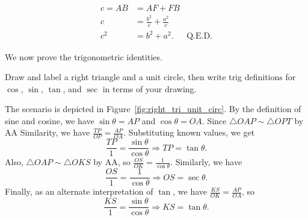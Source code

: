 \documentclass[../key.tex]{subfiles}
\begin{document}
\begin{align*}
c=AB &= AF+FB \\
c &= \frac{b^2}{c}+\frac{a^2}{c} \\
c^2 &= b^2 + a^2. & \text{Q.E.D.}
\end{align*}

\begin{outer_problem}
\item We now prove the trigonometric identities.
\end{outer_problem}

\begin{inner_problem}
\item Draw and label a right triangle and a unit circle, then write trig definitions for $\cos$, $\sin$, $\tan$, and $\sec$ in terms of your drawing.
\end{inner_problem}

\noindent The scenario is depicted in Figure~\ref{fig:right_tri_unit_circ}. By the definition of sine and cosine, we have $\sin\theta=AP$ and $\cos\theta=OA$. Since $\triangle OAP \sim \triangle OPT$ by AA Similarity, we have $\frac{TP}{OP}=\frac{AP}{OA}$. Substituting known values, we get $$\frac{TP}{1}=\frac{\sin\theta}{\cos\theta}\Longrightarrow TP=\tan\theta.$$ Also, $\triangle OAP \sim \triangle OKS$ by AA, so $\frac{OS}{OK}=\frac{1}{\cos\theta}$. Similarly, we have $$\frac{OS}{1}=\frac{1}{\cos\theta}\Longrightarrow OS=\sec\theta.$$ Finally, as an alternate interpretation of $\tan$, we have $\frac{KS}{OK}=\frac{AP}{OA}$, so $$\frac{KS}{1}=\frac{\sin\theta}{\cos\theta}\Longrightarrow KS = \tan\theta.$$
\end{document}
